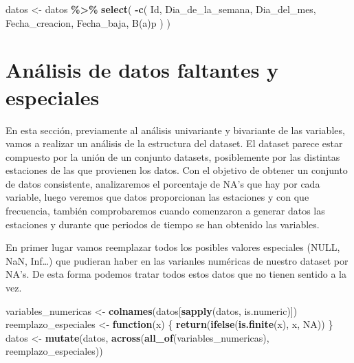 \documentclass[notspecified,article,submit,moreauthors,pdftex]{Definitions/mdpi}
\newenvironment{Shaded}{\begin{snugshade}}{\end{snugshade}}
\newcommand{\ConstantTok}[1]{\textcolor[rgb]{0.56,0.35,0.01}{#1}}
\newcommand{\ControlFlowTok}[1]{\textcolor[rgb]{0.13,0.29,0.53}{\textbf{#1}}}
\newcommand{\FunctionTok}[1]{\textcolor[rgb]{0.13,0.29,0.53}{\textbf{#1}}}
\newcommand{\NormalTok}[1]{#1}
\newcommand{\OtherTok}[1]{\textcolor[rgb]{0.56,0.35,0.01}{#1}}
\newcommand{\SpecialCharTok}[1]{\textcolor[rgb]{0.81,0.36,0.00}{\textbf{#1}}}
\newcommand{\StringTok}[1]{\textcolor[rgb]{0.31,0.60,0.02}{#1}}
\begin{document}
\begin{Shaded}
\begin{Highlighting}[]
\NormalTok{datos }\OtherTok{\textless{}{-}}
\NormalTok{  datos }\SpecialCharTok{\%\textgreater{}\%} \FunctionTok{select}\NormalTok{(}
    \SpecialCharTok{{-}}\FunctionTok{c}\NormalTok{(}
      \StringTok{\textquotesingle{}Id\textquotesingle{}}\NormalTok{,}
      \StringTok{\textquotesingle{}Dia\_de\_la\_semana\textquotesingle{}}\NormalTok{,}
      \StringTok{\textquotesingle{}Dia\_del\_mes\textquotesingle{}}\NormalTok{,}
      \StringTok{\textquotesingle{}Fecha\_creacion\textquotesingle{}}\NormalTok{,}
      \StringTok{\textquotesingle{}Fecha\_baja\textquotesingle{}}\NormalTok{,}
      \StringTok{\textquotesingle{}B(a)p\textquotesingle{}}
\NormalTok{    )}
\NormalTok{  )}
\end{Highlighting}
\end{Shaded}

\hypertarget{anuxe1lisis-de-datos-faltantes-y-especiales}{%
\section{Análisis de datos faltantes y
especiales}\label{anuxe1lisis-de-datos-faltantes-y-especiales}}

En esta sección, previamente al análisis univariante y bivariante de las
variables, vamos a realizar un análisis de la estructura del dataset. El
dataset parece estar compuesto por la unión de un conjunto datasets,
posiblemente por las distintas estaciones de las que provienen los
datos. Con el objetivo de obtener un conjunto de datos consistente,
analizaremos el porcentaje de NA's que hay por cada variable, luego
veremos que datos proporcionan las estaciones y con que frecuencia,
también comprobaremos cuando comenzaron a generar datos las estaciones y
durante que periodos de tiempo se han obtenido las variables.

En primer lugar vamos reemplazar todos los posibles valores especiales
(NULL, NaN, Inf\ldots) que pudieran haber en las varianles numéricas de
nuestro dataset por NA's. De esta forma podemos tratar todos estos datos
que no tienen sentido a la vez.

\begin{Shaded}
\begin{Highlighting}[]
\NormalTok{variables\_numericas }\OtherTok{\textless{}{-}} \FunctionTok{colnames}\NormalTok{(datos[}\FunctionTok{sapply}\NormalTok{(datos, is.numeric)])}
\NormalTok{reemplazo\_especiales }\OtherTok{\textless{}{-}} \ControlFlowTok{function}\NormalTok{(x) \{}
  \FunctionTok{return}\NormalTok{(}\FunctionTok{ifelse}\NormalTok{(}\FunctionTok{is.finite}\NormalTok{(x), x, }\ConstantTok{NA}\NormalTok{))}
\NormalTok{\}}
\NormalTok{datos }\OtherTok{\textless{}{-}}
  \FunctionTok{mutate}\NormalTok{(datos, }\FunctionTok{across}\NormalTok{(}\FunctionTok{all\_of}\NormalTok{(variables\_numericas), reemplazo\_especiales))}
\end{Highlighting}
\end{Shaded}
\end{document}
